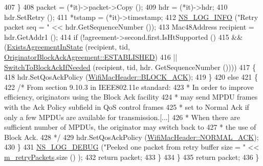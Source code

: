 \begin{DoxyCode}
407             \}
408           packet = (*it)->packet->Copy ();
409           hdr = (*it)->hdr;
410           hdr.SetRetry ();
411           *tstamp = (*it)->timestamp;
412           \hyperlink{group__logging_gafbd73ee2cf9f26b319f49086d8e860fb}{NS\_LOG\_INFO} (\textcolor{stringliteral}{"Retry packet seq = "} << hdr.GetSequenceNumber ());
413           Mac48Address recipient = hdr.GetAddr1 ();
414           \textcolor{keywordflow}{if} (!agreement->second.first.IsHtSupported ()
415               && (\hyperlink{classns3_1_1BlockAckManager_ae13c4678f75ebfda7f63d0521878662b}{ExistsAgreementInState} (recipient, tid, 
      \hyperlink{classns3_1_1OriginatorBlockAckAgreement_ab33ae8af8c458aca7437a472778e4761a341f78e1e094b88dea42e94b32871067}{OriginatorBlockAckAgreement::ESTABLISHED})
416                   || \hyperlink{classns3_1_1BlockAckManager_a20324b49d01312f731087f7f707a596a}{SwitchToBlockAckIfNeeded} (recipient, tid, hdr.
      GetSequenceNumber ())))
417             \{
418               hdr.SetQosAckPolicy (\hyperlink{classns3_1_1WifiMacHeader_ae3a382482f357972019f5e1b3162adc4a8d2763ea0083f1265fbf7dda6fdcf9fd}{WifiMacHeader::BLOCK\_ACK});
419             \}
420           \textcolor{keywordflow}{else}
421             \{
422               \textcolor{comment}{/* From section 9.10.3 in IEEE802.11e standard:}
423 \textcolor{comment}{               * In order to improve efficiency, originators using the Block Ack facility}
424 \textcolor{comment}{               * may send MPDU frames with the Ack Policy subfield in QoS control frames}
425 \textcolor{comment}{               * set to Normal Ack if only a few MPDUs are available for transmission.[...]}
426 \textcolor{comment}{               * When there are sufficient number of MPDUs, the originator may switch back to}
427 \textcolor{comment}{               * the use of Block Ack.}
428 \textcolor{comment}{               */}
429               hdr.SetQosAckPolicy (\hyperlink{classns3_1_1WifiMacHeader_ae3a382482f357972019f5e1b3162adc4a9f52b9c6ca65d046ce2be9d70bce28cf}{WifiMacHeader::NORMAL\_ACK});
430             \}
431           \hyperlink{group__logging_ga413f1886406d49f59a6a0a89b77b4d0a}{NS\_LOG\_DEBUG} (\textcolor{stringliteral}{"Peeked one packet from retry buffer size = "} << 
      \hyperlink{classns3_1_1BlockAckManager_a2851f947dd68945ebc25961cff893ed9}{m\_retryPackets}.size () );
432           \textcolor{keywordflow}{return} packet;
433         \}
434     \}
435   \textcolor{keywordflow}{return} packet;
436 \}
\end{DoxyCode}


